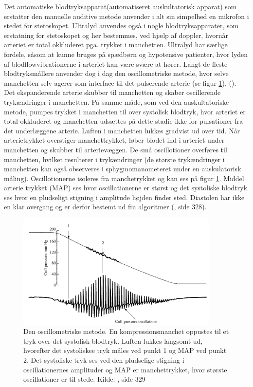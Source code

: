 Det automatiske blodtryksapparat(automatiseret auskultatorisk apparat)  som erstatter den manuelle auditive metode anvender i alt sin simpelhed en mikrofon i stedet for stetoskopet. Ultralyd anvendes også i nogle blodtryksapparater, som erstatning for stetoskopet og her bestemmes, ved hjælp af doppler, hvornår arteriet er total okkluderet pga. trykket i manchetten. Ultralyd har særlige fordele, såsom at kunne bruges på spædbørn og hypotensive patienter, hvor lyden af blodflowvibrationerne i arteriet kan være svære at hører. Langt de fleste blodtryksmållere anvender dog i dag den oscillometriske metode, hvor selve manchetten selv agerer som interface til det pulserende arterie (se figur \ref{fig:OscillometriskMetode}), (\cite{RefWorks:24}). Det ekspanderende arterie skubber til manchetten og skaber oscillerende trykændringer i manchetten. På samme måde, som ved den auskultatoriske metode, pumpes trykket i manchetten til over systolisk blodtryk, hvor arteriet er total okkluderet og manchetten udsættes på dette stadie ikke for pulsationer fra det underlæggene arterie. Luften i manchetten lukkes gradvist ud over tid. Når arterietrykket overstiger manchettrykket, løber blodet ind i arteriet under manchetten og skubber til arterievæggen. De små oscillotioner overføres til manchetten, hvilket resulterer i trykændringer (de største trykændringer i manchetten kan også observeres i sphygmomanometeret under en auskulatorisk måling). Oscillotionerne isoleres fra manchetrykket og kan ses på figur \ref{fig:OscillometriskMetode}. Middel arterie trykket (MAP) ses hvor oscillationerne er størst og det systoliske blodtryk ses hvor en pludseligt stigning i amplitude højden finder sted. Diastolen har ikke en klar overgang og er derfor bestemt ud fra algoritmer (\cite{RefWorks:27}, side 328).

\begin{figure}[H]
	\centering
	\includegraphics[width=0.9\textwidth]{billeder/OscillometriskMetode.png}
	\caption{Den oscillometriske metode. En kompressionsmanchet oppustes til et tryk over det systolisk blodtryk. Luften lukkes langsomt ud, hvorefter det systoliskee tryk måles ved punkt 1 og MAP ved punkt 2. Det systoliske tryk ses ved den pludselige stigning i oscillationernes amplituder og MAP er manchettrykket, hvor største oscillationer er til stede. Kilde: \cite{RefWorks:27}, side 329} \label{fig:OscillometriskMetode}
\end{figure}

